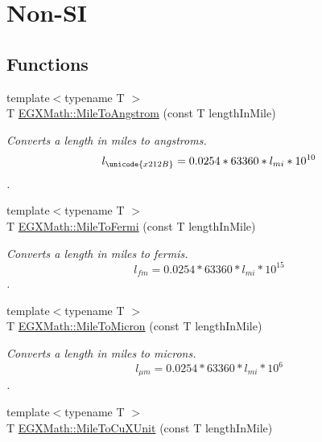 \hypertarget{group___e_g_x_math-_conversions-_length_conversions-_imperial-_mile-_non-_s_i}{}\section{Non-\/\+SI}
\label{group___e_g_x_math-_conversions-_length_conversions-_imperial-_mile-_non-_s_i}
\subsection*{Functions}
\begin{DoxyCompactItemize}
\item 
{\footnotesize template$<$typename T $>$ }\\T \mbox{\hyperlink{group___e_g_x_math-_conversions-_length_conversions-_imperial-_mile-_non-_s_i_ga291d6035f59be619459011941676f7c7}{E\+G\+X\+Math\+::\+Mile\+To\+Angstrom}} (const T length\+In\+Mile)
\begin{DoxyCompactList}\small\item\em Converts a length in miles to angstroms. \[ l_{\unicode{x212B}}=0.0254 * 63360 * l_{mi} * 10^{10} \]. \end{DoxyCompactList}\item 
{\footnotesize template$<$typename T $>$ }\\T \mbox{\hyperlink{group___e_g_x_math-_conversions-_length_conversions-_imperial-_mile-_non-_s_i_gaf09d006cf827d210a8506e1add02cb0b}{E\+G\+X\+Math\+::\+Mile\+To\+Fermi}} (const T length\+In\+Mile)
\begin{DoxyCompactList}\small\item\em Converts a length in miles to fermis. \[ l_{fm}=0.0254 * 63360 * l_{mi} * 10^{15} \]. \end{DoxyCompactList}\item 
{\footnotesize template$<$typename T $>$ }\\T \mbox{\hyperlink{group___e_g_x_math-_conversions-_length_conversions-_imperial-_mile-_non-_s_i_ga0ab31c74561b6127ec6639c17c5c94e5}{E\+G\+X\+Math\+::\+Mile\+To\+Micron}} (const T length\+In\+Mile)
\begin{DoxyCompactList}\small\item\em Converts a length in miles to microns. \[ l_{\mu m}=0.0254 * 63360 * l_{mi} * 10^{6} \]. \end{DoxyCompactList}\item 
{\footnotesize template$<$typename T $>$ }\\T \mbox{\hyperlink{group___e_g_x_math-_conversions-_length_conversions-_imperial-_mile-_non-_s_i_ga63bec635d857da530046d1c5a165b1d8}{E\+G\+X\+Math\+::\+Mile\+To\+Cu\+X\+Unit}} (const T length\+In\+Mile)

\end{DoxyCompactItemize}
